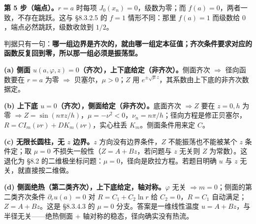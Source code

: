 \textbf{第 5 步（端点）。}$r=a$ 时每项 $J_0(x_n)=0$，级数为零；而 $f(a)=0$，两者一致，不存在跳跃。这与 \S8.3.2.5 的 $f=1$ 情形不同：那里 $f(a)=1$ 而级数给 $0$，端点必然跳跃，级数收敛到 $1/2$。


判据只有一句：\textbf{哪一组边界是齐次的，就由哪一组定本征值；齐次条件要求对应的函数反复回到零，所以那一组必须是振荡型。}

\textbf{(a) 侧面 $u(a,\varphi,z)=0$（齐次），上下底给定（非齐次）。}侧面齐次 $\Rightarrow$ 径向函数要在 $r=a$ 为零 $\Rightarrow$ 贝塞尔，$\mu>0$；$Z$ 用 $e^{\pm\sqrt\mu z}$，其系数由上下底的非齐次数据定。

\textbf{(b) 上下底 $u=0$（齐次），侧面给定（非齐次）。}底面齐次 $\Rightarrow Z$ 要在 $z=0,h$ 为零 $\Rightarrow Z=\sin(n\pi z/h)$，$\mu=-\nu^2<0$，$\nu_n=n\pi/h$；径向方程是修正贝塞尔，$R=C I_m(\nu r)+D K_m(\nu r)$，实心柱丢 $K_m$。侧面条件用来定 $C$。

\textbf{(c) 无限长圆柱，无 $z$ 边界。}$z$ 方向没有边界条件，$Z$ 不能振荡也不能被某个 $z$ 条件定；取 $\mu=0$ 不损失一般性（$Z=A+Bz$，若问题与 $z$ 无关则 $Z$ 为常数）。这退化为 \S8.2 的二维极坐标问题：$\mu=0$，径向是欧拉方程。若题目明确 $u$ 与 $z$ 无关，就直接按二维做。

\textbf{(d) 侧面绝热（第二类齐次），上下底给定，轴对称。}$\varphi$ 无关 $\Rightarrow m=0$；侧面的第二类齐次条件 $\partial_ru(a)=0$ 对 $R=C_1+C_2\ln r$ 给 $C_2=0$，$R=C_1$ 自动满足；$Z=A+Bz$。这是 \S8.3.4.3 的 $\mu=0$ 分支。答案是一维线性温度 $u=A+Bz$，与半径无关——绝热侧面 + 轴对称的稳态，径向确实没有热流。


